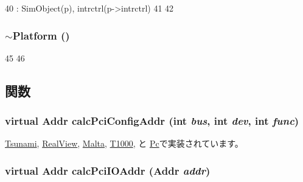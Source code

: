 \begin{DoxyCode}
40     : SimObject(p), intrctrl(p->intrctrl)
41 {
42 }
\end{DoxyCode}
\hypertarget{classPlatform_ac9776566b67c64e4c343b6e6546cb177}{
\subsubsection[{$\sim$Platform}]{\setlength{\rightskip}{0pt plus 5cm}$\sim${\bf Platform} ()}}
\label{classPlatform_ac9776566b67c64e4c343b6e6546cb177}



\begin{DoxyCode}
45 {
46 }
\end{DoxyCode}


\subsection{関数}
\hypertarget{classPlatform_a4a2bdce1a8794dd3ea6ca12b36320433}{
\subsubsection[{calcPciConfigAddr}]{\setlength{\rightskip}{0pt plus 5cm}virtual {\bf Addr} calcPciConfigAddr (int {\em bus}, \/  int {\em dev}, \/  int {\em func})}}
\label{classPlatform_a4a2bdce1a8794dd3ea6ca12b36320433}


\hyperlink{classTsunami_a5b8797a83289cb5fd895c9a5dc7eae6f}{Tsunami}, \hyperlink{classRealView_a5b8797a83289cb5fd895c9a5dc7eae6f}{RealView}, \hyperlink{classMalta_a5b8797a83289cb5fd895c9a5dc7eae6f}{Malta}, \hyperlink{classT1000_a5b8797a83289cb5fd895c9a5dc7eae6f}{T1000}, と \hyperlink{classPc_a5b8797a83289cb5fd895c9a5dc7eae6f}{Pc}で実装されています。\hypertarget{classPlatform_a3d1d55996e865ab1b65c732496c08b00}{
\subsubsection[{calcPciIOAddr}]{\setlength{\rightskip}{0pt plus 5cm}virtual {\bf Addr} calcPciIOAddr ({\bf Addr} {\em addr})}}
\label{classPlatform_a3d1d55996e865ab1b65c732496c08b00}



